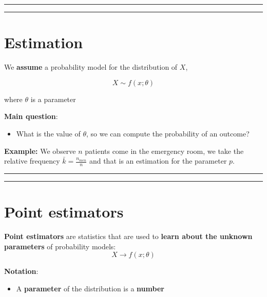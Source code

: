 \documentclass[
]{book}
\providecommand{\tightlist}{%
  \setlength{\itemsep}{0pt}\setlength{\parskip}{0pt}}
\begin{document}
\begin{center}\rule{0.5\linewidth}{0.5pt}\end{center}

\begin{center}\rule{0.5\linewidth}{0.5pt}\end{center}

\hypertarget{estimation}{%
\section{Estimation}\label{estimation}}

We \textbf{assume} a probability model for the distribution of \(X\),

\[X \sim f(x; \theta)\]

where \(\theta\) is a parameter

\textbf{Main question}:

\begin{itemize}
\tightlist
\item
  What is the value of \(\theta\), so we can compute the probability of an outcome?
\end{itemize}

\textbf{Example:} We observe \(n\) patients come in the emergency room, we take the relative frequency \(\bar{k}=\frac{n_{men}}{n}\) and that is an estimation for the parameter \(p\).

\begin{center}\rule{0.5\linewidth}{0.5pt}\end{center}

\begin{center}\rule{0.5\linewidth}{0.5pt}\end{center}

\hypertarget{point-estimators-1}{%
\section{Point estimators}\label{point-estimators-1}}

\textbf{Point estimators} are statistics that are used to \textbf{learn about the unknown parameters} of probability models:
\[X \rightarrow f(x; \theta)\]

\textbf{Notation}:

\begin{itemize}
\tightlist
\item
  A \textbf{parameter} of the distribution is a \textbf{number}
\end{itemize}
\end{document}
